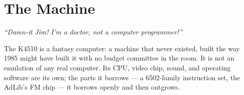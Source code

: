 \chapter{The Machine}\label{cha:machine}

\begin{flushright}
\begin{minipage}{0.78\linewidth}\raggedleft
\emph{``Damn-it Jim! I'm a doctor, not a computer programmer!''}\par
\vspace{1mm}{\small --- Dr Leonard ``Bones'' McCoy}
\end{minipage}
\end{flushright}
\vspace{4mm}

The K4510 is a fantasy computer: a machine that never existed, built the
way 1985 might have built it with no budget committee in the room. It is not
an emulation of any real computer. Its CPU, video chip, sound, and operating
software are its own; the parts it borrows --- a 6502-family instruction set,
the AdLib's FM chip --- it borrows openly and then outgrows.

